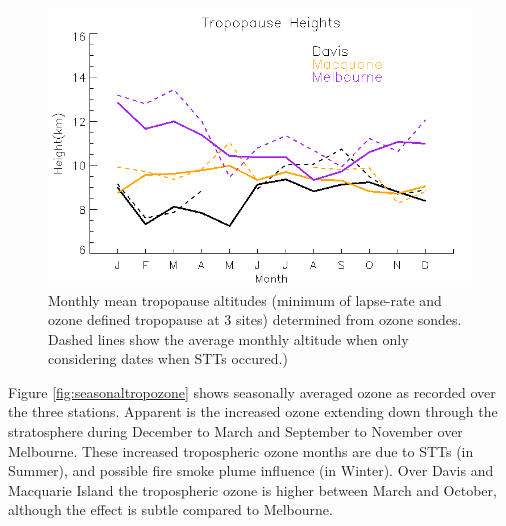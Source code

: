 \documentclass{article}
\begin{document}
    \begin{figure}[!htbp]
	\begin{center}
	\includegraphics[width=0.8\columnwidth]{figures/tpheights}
	\caption{Monthly mean tropopause altitudes (minimum of lapse-rate and ozone defined tropopause at 3 sites) determined from ozone sondes.
	Dashed lines show the average monthly altitude when only considering dates when STTs occured.) 
	}
	\label{fig:seasonaltpheights}
	\end{center}
    \end{figure}

    Figure \ref{fig:seasonaltropozone} shows seasonally averaged ozone as recorded over the three stations.
    Apparent is the increased ozone extending down through the stratosphere during December to March and September to November over Melbourne.
    These increased tropospheric ozone months are due to STTs (in Summer), and possible fire smoke plume influence (in Winter).
    Over Davis and Macquarie Island the tropospheric ozone is higher between March and October, although the effect is subtle compared to Melbourne.
    
\end{document}
